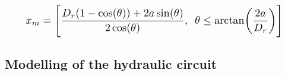 \documentclass[3p,twocolumn,preprint]{elsarticle}
\begin{document}
\begin{equation}
\resizebox{.9\linewidth}{!}{$	
x_m = \Biggl[ \dfrac{D_r(1-\cos(\theta))+2a\sin(\theta)}{2\cos(\theta)}\text{,}
				~~ \theta\leq\arctan\biggl(\dfrac{2a}{D_r}\biggr) \Biggr]
				$}
\label{eq:theta_fonction_de_xm}
\end{equation}

	\subsection{Modelling of the hydraulic circuit}	
	\label{subsec:The hydraulic circuit}
\end{document}
